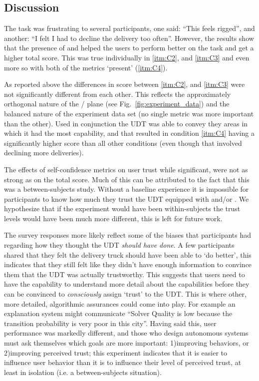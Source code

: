 \subsection{Discussion} \label{sec:discussion}
The task was frustrating to several participants, one said: ``This feels rigged'', and another: ``I felt I had to decline the delivery too often''. However, the results show that the presence of \xQ{} and \xO{} helped the users to perform better on the task and get a higher total score. This was true individually in \ref{itm:C2}, and \ref{itm:C3} and even more so with both of the metrics `present' (\ref{itm:C4}). 

As reported above the differences in score between \ref{itm:C2}, and \ref{itm:C3} were not significantly different from each other. This reflects the approximately orthogonal nature of the \xQ/\xO{} plane (see Fig.~\ref{fig:experiment_data}) and the balanced nature of the experiment data set (no single metric was more important than the other). Used in conjunction the UDT was able to convey they areas in which it had the most capability, and that resulted in condition \ref{itm:C4} having a significantly higher score than all other conditions (even though that involved declining more deliveries).

The effects of self-confidence metrics on user trust while significant, were not as strong as on the total score. Much of this can be attributed to the fact that this was a between-subjects study. Without a baseline experience it is impossible for participants to know how much they trust the UDT equipped with \xQ{} and/or \xO. We hypothesize that if the experiment would have been within-subjects the trust levels would have been much more different, this is left for future work.

The survey responses more likely reflect some of the biases that participants had regarding how they thought the UDT \emph{should have done}. A few participants shared that they felt the delivery truck should have been able to `do better', this indicates that they still felt like they didn't have enough information to convince them that the UDT was actually trustworthy. This suggests that users need to have the capability to understand more detail about the capabilities before they can be convinced to \emph{consciously} assign `trust' to the UDT. This is where other, more detailed, algorithmic assurances could come into play. For example an explanation system might communicate ``Solver Quality is low because the transition probability is very poor in this city''. Having said this, user performance was markedly different, and those who design autonomous systems must ask themselves which goals are more important: 1)improving behaviors, or 2)improving perceived trust; this experiment indicates that it is easier to influence user behavior than it is to influence their level of perceived trust, at least in isolation (i.e. a between-subjects situation).

